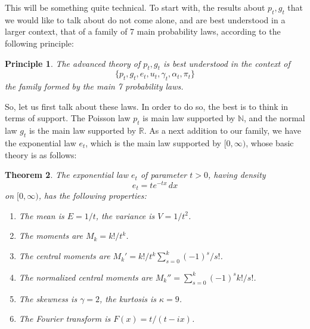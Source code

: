 \documentclass[12pt]{amsbook}
\newtheorem{theorem}{Theorem}[chapter]
\newtheorem{principle}[theorem]{Principle}
\begin{document}
\bigskip

This will be something quite technical. To start with, the results about $p_t,g_t$ that we would like to talk about do not come alone, and are best understood in a larger context, that of a family of 7 main probability laws, according to the following principle:

\begin{principle}
The advanced theory of $p_t,g_t$ is best understood in the context of
$$\{p_t,g_t,e_t,u_t,\gamma_t,\alpha_t,\pi_t\}$$
the family formed by the main 7 probability laws.
\end{principle}

So, let us first talk about these laws. In order to do so, the best is to think in terms of support. The Poisson law $p_t$ is main law supported by $\mathbb N$, and the normal law $g_t$ is the main law supported by $\mathbb R$. As a next addition to our family, we have the exponential law $e_t$, which is the main law supported by $[0,\infty)$, whose basic theory is as follows:


\begin{theorem}
The exponential law $e_t$ of parameter $t>0$, having density
$$e_t=te^{-tx}\,dx$$
on $[0,\infty)$, has the following properties:
\begin{enumerate}
\item The mean is $E=1/t$, the variance is $V=1/t^2$.

\item The moments are $M_k=k!/t^k$.

\item The central moments are $M_k'=k!/t^k\sum_{s=0}^k(-1)^s/s!$.

\item The normalized central moments are $M_k''=\sum_{s=0}^k(-1)^sk!/s!$.

\item The skewness is $\gamma=2$, the kurtosis is $\kappa=9$.

\item The Fourier transform is $F(x)=t/(t-ix)$.
\end{enumerate}
\end{theorem}
\end{document}
